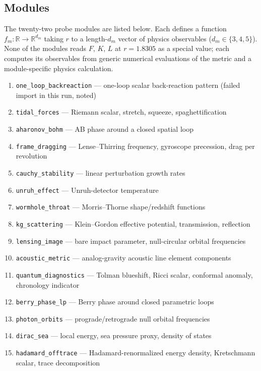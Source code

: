 \documentclass[11pt,letterpaper]{article}
\begin{document}
\subsection{Modules}\label{ssec:modules}

The twenty-two probe modules are listed below. Each defines a function $f_m : \mathbb{R} \to \mathbb{R}^{d_m}$ taking $r$ to a length-$d_m$ vector of physics observables ($d_m \in \{3, 4, 5\}$). None of the modules reads $F$, $K$, $L$ at $r = 1.8305$ as a special value; each computes its observables from generic numerical evaluations of the metric and a module-specific physics calculation.

\begin{small}
\begin{enumerate}[leftmargin=*,itemsep=0pt]
\item \texttt{one\_loop\_backreaction} --- one-loop scalar back-reaction pattern (failed import in this run, noted)
\item \texttt{tidal\_forces} --- Riemann scalar, stretch, squeeze, spaghettification
\item \texttt{aharonov\_bohm} --- AB phase around a closed spatial loop
\item \texttt{frame\_dragging} --- Lense--Thirring frequency, gyroscope precession, drag per revolution
\item \texttt{cauchy\_stability} --- linear perturbation growth rates
\item \texttt{unruh\_effect} --- Unruh-detector temperature
\item \texttt{wormhole\_throat} --- Morris--Thorne shape/redshift functions
\item \texttt{kg\_scattering} --- Klein--Gordon effective potential, transmission, reflection
\item \texttt{lensing\_image} --- bare impact parameter, null-circular orbital frequencies
\item \texttt{acoustic\_metric} --- analog-gravity acoustic line element components
\item \texttt{quantum\_diagnostics} --- Tolman blueshift, Ricci scalar, conformal anomaly, chronology indicator
\item \texttt{berry\_phase\_lp} --- Berry phase around closed parametric loops
\item \texttt{photon\_orbits} --- prograde/retrograde null orbital frequencies
\item \texttt{dirac\_sea} --- local energy, sea pressure proxy, density of states
\item \texttt{hadamard\_offtrace} --- Hadamard-renormalized energy density, Kretschmann scalar, trace decomposition

\end{enumerate}
\end{small}
\end{document}
